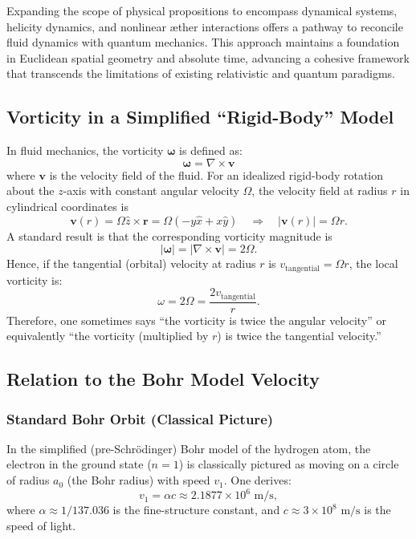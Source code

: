 \documentclass[a4paper,10pt]{article}
\begin{document}
    Expanding the scope of physical propositions to encompass dynamical systems, helicity dynamics, and nonlinear æther interactions offers a pathway to reconcile fluid dynamics with quantum mechanics. This approach maintains a foundation in Euclidean spatial geometry and absolute time, advancing a cohesive framework that transcends the limitations of existing relativistic and quantum paradigms.



    \subsection{Vorticity in a Simplified ``Rigid-Body'' Model}
    In fluid mechanics, the vorticity $\boldsymbol{\omega}$ is defined as:
    \begin{equation}
        \boldsymbol{\omega} = \nabla \times \mathbf{v}
    \end{equation}
    where $\mathbf{v}$ is the velocity field of the fluid. For an idealized rigid-body rotation about the $z$-axis with constant angular velocity $\Omega$, the velocity field at radius $r$ in cylindrical coordinates is
    \begin{equation}
        \mathbf{v}(r) = \Omega \hat{z} \times \mathbf{r} = \Omega(-y\hat{x} + x\hat{y}) \quad \Rightarrow \quad |
        \mathbf{v}(r)| = \Omega r.
    \end{equation}
    A standard result is that the corresponding vorticity magnitude is
    \begin{equation}
        |\boldsymbol{\omega}| = \left| \nabla \times \mathbf{v} \right| = 2\Omega.
    \end{equation}
    Hence, if the tangential (orbital) velocity at radius $r$ is $v_\text{tangential} = \Omega r$, the local vorticity is:
    \begin{equation}
        \omega = 2\Omega = \frac{2v_\text{tangential}}{r}.
    \end{equation}
    Therefore, one sometimes says ``the vorticity is twice the angular velocity'' or equivalently ``the vorticity (multiplied by $r$) is twice the tangential velocity.''

    \subsection{Relation to the Bohr Model Velocity}
    \subsubsection{Standard Bohr Orbit (Classical Picture)}
    In the simplified (pre-Schr\"odinger) Bohr model of the hydrogen atom, the electron in the ground state ($n=1$) is classically pictured as moving on a circle of radius $a_0$ (the Bohr radius) with speed $v_1$. One derives:
    \begin{equation}
        v_1 = \alpha c \approx 2.1877 \times 10^6 \text{ m/s},
    \end{equation}
    where $\alpha \approx 1/137.036$ is the fine-structure constant, and $c \approx 3 \times 10^8 \text{ m/s}$ is the speed of light.
\end{document}
